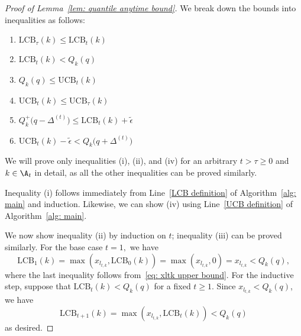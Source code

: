 \begin{proof}[Proof of Lemma~\ref{lem:  quantile anytime bound}]
We break down the bounds into  inequalities as follows:
\begin{multicols}{2}
\begin{enumerate}[label=(\roman*)]

    \item  $\mathrm{LCB}_{\tau}(k) \le \mathrm{LCB}_t(k)$
    
    \item $\mathrm{LCB}_t(k)  < Q_k(q)$
    
    
    \item $Q_k(q) \le \mathrm{UCB}_t(k)$
    
    \item $\mathrm{UCB}_t(k)  \le \mathrm{UCB}_{\tau}(k)$
    
    \item $Q^+_k\big(q -  \Delta^{(t)} \big)  \le \mathrm{LCB}_t(k) + \tilde{\epsilon}$

    \item $\mathrm{UCB}_t(k) - \tilde{\epsilon}
        <
         Q_k\big(q + \Delta^{(t)} \big)$
\end{enumerate}
\end{multicols}
We will prove only inequalities (i), (ii), and (iv)
for an arbitrary $t  > \tau \ge 0$ and  $k \in \A_t$
in detail, as all the other inequalities can be proved similarly.

Inequality (i) follows immediately from Line~\ref{LCB definition} of Algorithm~\ref{alg: main} and induction. Likewise, we can show (iv) using Line~\ref{UCB definition} of Algorithm~\ref{alg: main}.
 
We now show inequality (ii) by induction on $t$;
inequality (iii) can be proved similarly.
    For the base case $t = 1,$
    we have
    \begin{equation}
        \mathrm{LCB}_1(k) =
        \max \left( x_{l_{t, k}}, \mathrm{LCB}_{0}(k) \right) =
        \max \left( x_{l_{t, k}}, 0 \right) =
        x_{l_{t, k}} < Q_k(q),
    \end{equation}
    where the last inequality follows from~\eqref{eq: xltk upper bound}.   
    For the inductive step, suppose that $\mathrm{LCB}_t(k) < Q_k(q)$ for a fixed $t \ge 1$. Since $x_{l_{t, k}} < Q_k(q)$, we have
    \begin{equation}
        \mathrm{LCB}_{t+1}(k) =
            \max
            \left(
            x_{l_{t, k}},
            \mathrm{LCB}_{t}(k)
            \right)
            < Q_k(q)
    \end{equation}
    as desired.
    


\end{proof}
